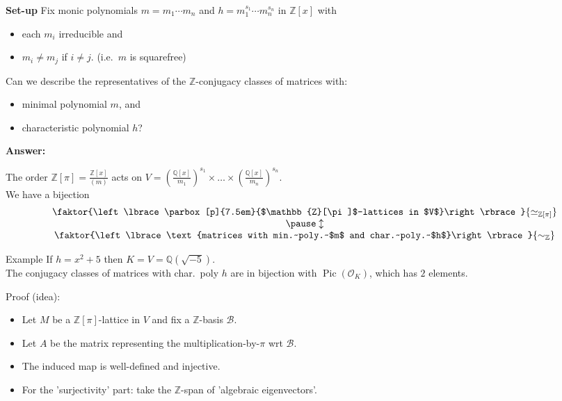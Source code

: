 \documentclass[aspectratio=169,usenames,dvipsnames]{beamer}
\def\Q{\mathbb{Q}}
\def\Z{\mathbb{Z}}
\DeclareMathOperator{\Pic}{Pic}
\newcommand{\cO}{{\mathcal O}}
\newcommand{\set}[1]{\left\lbrace#1\right\rbrace }
\begin{document}
\begin{frame}{}
   {\bf Set-up} 
   Fix monic polynomials $m=m_1\cdots m_n$ and $h=m_1^{s_1}\cdots m_n^{s_n}$ in $\Z[x]$ with 
   \begin{itemize}
      \item each $m_i$ irreducible and 
      \item $m_i\neq m_j$ if $i\neq j$. (i.e.~$m$ is squarefree)
   \end{itemize}
   
   Can we describe the representatives of the $\Z$-conjugacy classes of matrices with:
   \begin{itemize}
      \item minimal polynomial $m$, and
      \item characteristic polynomial $h$?
   \end{itemize}
   \pause
   {\bf Answer:}
   \begin{theorem}
      The order $\Z[\pi]=\frac{\Z[x]}{(m)}$ acts on $V=\left(\frac{\Q[x]}{m_1}\right)^{s_1}
      \times \ldots \times 
      \left(\frac{\Q[x]}{m_n}\right)^{s_n}$.\\
      We have a bijection
      \[ \begin{array}{cc}
         \faktor{\set{\parbox[p]{7.5em}{$\Z[\pi]$-lattices in $V$}}}
         {\simeq_{\Z[\pi]}}\\
         \pause \updownarrow\\
         \faktor{\set{\text{matrices with min.~poly.~$m$ and char.~poly.~$h$}}}{\sim_\Z}\\
      \end{array} \]
   \end{theorem}
\end{frame}

\begin{frame}
   \begin{exampleblock}{Example}
      If $h=x^2+5$ then $K=V=\Q(\sqrt{-5})$.\\ 
      The conjugacy classes of matrices with char.~poly $h$ are in bijection with $\Pic(\cO_K)$, which has $2$ elements.
   \end{exampleblock}

   \pause
   Proof (idea):\\
   \begin{itemize}
      \pause
      \item Let $M$ be a $\Z[\pi]$-lattice in $V$ and fix a $\Z$-basis $\mathcal{B}$.
      \pause
      \item Let $A$ be the matrix representing the multiplication-by-$\pi$ wrt $\mathcal{B}$.
      \pause
      \item The induced map is well-defined and injective.
      \pause
      \item For the 'surjectivity' part: take the $\Z$-span of 'algebraic eigenvectors'.
   \end{itemize}
\end{frame}
\end{document}
